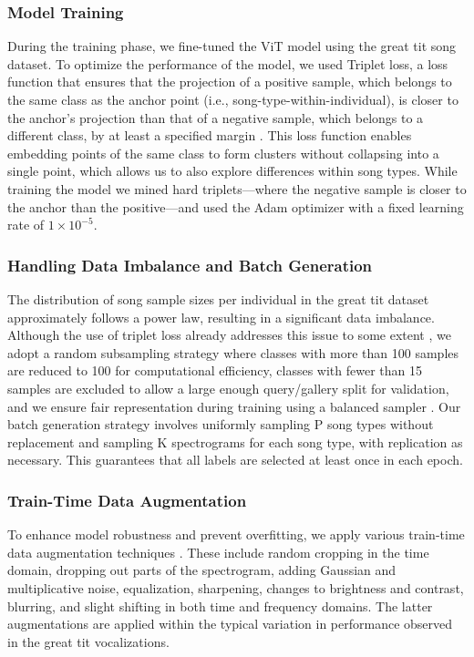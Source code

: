 \subsubsection{Model Training}
During the training phase, we fine-tuned the ViT model using the great tit song dataset. To optimize the performance of the model, we used Triplet loss, a loss function that ensures that the projection of a positive sample, which belongs to the same class as the anchor point (i.e., song-type-within-individual), is closer to the anchor's projection than that of a negative sample, which belongs to a different class, by at least a specified margin \parencite{hermans2017, hoffer2018}. This loss function enables embedding points of the same class to form clusters without collapsing into a single point, which allows us to also explore differences within song types. While training the model we mined hard triplets---where the negative sample is closer to the anchor than the positive---and used the Adam optimizer with a fixed learning rate of $1 \times 10^{-5}$.

\subsubsection{Handling Data Imbalance and Batch Generation}
The distribution of song sample sizes per individual in the great tit dataset approximately follows a power law, resulting in a significant data imbalance. Although the use of triplet loss already addresses this issue to some extent \parencite{thakur2019}, we adopt a random subsampling strategy where classes with more than 100 samples are reduced to 100 for computational efficiency, classes with fewer than 15 samples are excluded to allow a large enough query/gallery split for validation, and we ensure fair representation during training using a balanced sampler \parencite{hermans2017}. Our batch generation strategy involves uniformly sampling P song types without replacement and sampling K spectrograms for each song type, with replication as necessary. This guarantees that all labels are selected at least once in each epoch.

\subsubsection{Train-Time Data Augmentation}
To enhance model robustness and prevent overfitting, we apply various train-time data augmentation techniques \parencite{mumuni2022, perez2017, shorten2019}. These include random cropping in the time domain, dropping out parts of the spectrogram, adding Gaussian and multiplicative noise, equalization, sharpening, changes to brightness and contrast, blurring, and slight shifting in both time and frequency domains. The latter augmentations are applied within the typical variation in performance observed in the great tit vocalizations.

